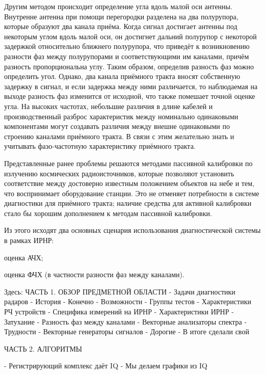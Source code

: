 \documentclass{report}
\begin{document}
Другим методом происходит определение угла вдоль малой оси антенны. Внутренне антенна при помощи перегородки разделена на два полурупора, которые образуют два канала приёма. Когда сигнал достигает антенны под некоторым углом вдоль малой оси, он достигнет дальний полурупор с некоторой задержкой относительно ближнего полурупора, что приведёт к возникновению разности фаз между полурупорами и соответствующими им каналами, причём разность пропорциональна углу. Таким образом, определив разность фаз можно определить угол. Однако, два канала приёмного тракта вносят собственную задержку в сигнал, и если задержка между ними различается, то наблюдаемая на выходе разность фаз изменится от исходной, что также помешает точной оценке угла. На высоких частотах, небольшие различия в длине кабелей и производственный разброс характеристик между номинально одинаковыми компонентами могут создавать различия между внешне одинаковыми по строению каналами приёмного тракта. В связи с этим желательно знать и учитывать фазо-частотную характеристику приёмного тракта.

Представленные ранее проблемы решаются методами пассивной калибровки по излучению космических радиоисточников, которые позволяют установить соответствие между достоверно известным положением объектов на небе и тем, что воспринимает оборудование станции. Это не отменяет потребности в системе диагностики для приёмного тракта; наличие средства для активной калибровки стало бы хорошим дополнением к методам пассивной калибровки.

Из этого исходят два основных сценария использования диагностической системы в рамках ИРНР:

\begin{enummarker}
    \item оценка АЧХ;
    \item оценка ФЧХ (в частности разности фаз между каналами).
\end{enummarker}

Здесь:
ЧАСТЬ 1. ОБЗОР ПРЕДМЕТНОЙ ОБЛАСТИ
- Задачи диагностики радаров
    - История
        - Конечно
    - Возможности
        - Группы тестов
- Характеристики РЧ устройств
- Специфика измерений на ИРНР
    - Характеристики ИРНР
    - Затухание
    - Разность фаз между каналами
- Векторные анализаторы спектра
    - Трудности
- Векторные генераторы сигналов
    - Дорогие
    - В итоге сделали свой

ЧАСТЬ 2. АЛГОРИТМЫ

- Регистрирующий комплекс даёт IQ
- Мы делаем графики из IQ
\end{document}
